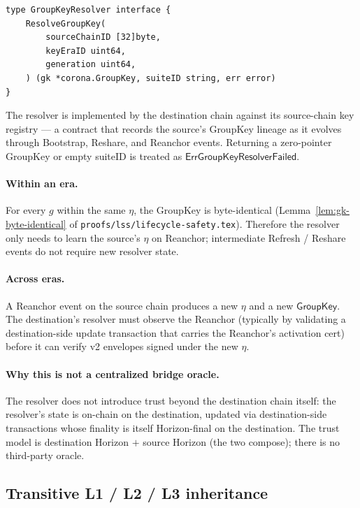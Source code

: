 \begin{verbatim}
type GroupKeyResolver interface {
    ResolveGroupKey(
        sourceChainID [32]byte,
        keyEraID uint64,
        generation uint64,
    ) (gk *corona.GroupKey, suiteID string, err error)
}
\end{verbatim}

The resolver is implemented by the destination chain against its source-chain key registry --- a contract that records the source's GroupKey lineage as it evolves through Bootstrap, Reshare, and Reanchor events. Returning a zero-pointer GroupKey or empty suiteID is treated as $\mathsf{ErrGroupKeyResolverFailed}$.

\paragraph{Within an era.} For every $g$ within the same $\eta$, the GroupKey is byte-identical (Lemma~\ref{lem:gk-byte-identical} of \texttt{proofs/lss/lifecycle-safety.tex}). Therefore the resolver only needs to learn the source's $\eta$ on Reanchor; intermediate Refresh / Reshare events do not require new resolver state.

\paragraph{Across eras.} A Reanchor event on the source chain produces a new $\eta$ and a new $\mathsf{GroupKey}$. The destination's resolver must observe the Reanchor (typically by validating a destination-side update transaction that carries the Reanchor's activation cert) before it can verify v2 envelopes signed under the new $\eta$.

\paragraph{Why this is not a centralized bridge oracle.} The resolver does not introduce trust beyond the destination chain itself: the resolver's state is on-chain on the destination, updated via destination-side transactions whose finality is itself Horizon-final on the destination. The trust model is destination Horizon $+$ source Horizon (the two compose); there is no third-party oracle.

\subsection{Transitive L1 / L2 / L3 inheritance}

